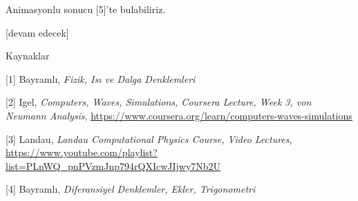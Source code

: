 \documentclass[12pt,fleqn]{article}\usepackage{../../common}
\begin{document}
Animasyonlu sonucu [5]'te bulabiliriz.

[devam edecek]

Kaynaklar

[1] Bayramlı, {\em Fizik, Isı ve Dalga Denklemleri}

[2] Igel, {\em Computers, Waves, Simulations, Coursera Lecture, Week 3, von Neumann Analysis},
    \url{https://www.coursera.org/learn/computers-waves-simulations}

[3] Landau, {\em Landau Computational Physics Course, Video Lectures},
    \url{https://www.youtube.com/playlist?list=PLnWQ_pnPVzmJnp794rQXIcwJIjwy7Nb2U}

[4] Bayramlı, {\em Diferansiyel Denklemler, Ekler, Trigonometri}
\end{document}
